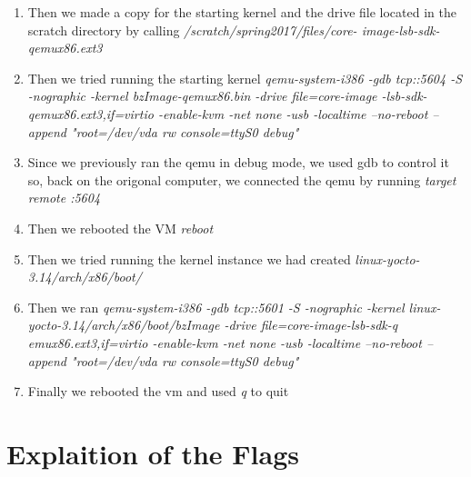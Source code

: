 \begin{enumerate}
    \item Then we made a copy for the starting kernel and the drive file located in the scratch directory by calling \textit{/scratch/spring2017/files/core-    image-lsb-sdk-qemux86.ext3}
    \item Then we tried running the starting kernel \textit{qemu-system-i386 -gdb tcp::5604 -S -nographic -kernel bzImage-qemux86.bin -drive file=core-image    -lsb-sdk-qemux86.ext3,if=virtio -enable-kvm -net none -usb -localtime --no-reboot --append "root=/dev/vda rw console=ttyS0 debug"}
    \item Since we previously ran the qemu in debug mode, we used gdb to control it so, back on the origonal computer, we connected the qemu by running \textit{target remote :5604}
    \item Then we rebooted the VM \textit{reboot}
    \item Then we tried running the kernel instance we had created \textit{linux-yocto-3.14/arch/x86/boot/}
    \item Then we ran \textit{qemu-system-i386 -gdb tcp::5601 -S -nographic -kernel linux-yocto-3.14/arch/x86/boot/bzImage  -drive file=core-image-lsb-sdk-q    emux86.ext3,if=virtio -enable-kvm -net none -usb -localtime --no-reboot --append "root=/dev/vda rw console=ttyS0 debug"}
    \item Finally we rebooted the vm and used \textit{q} to quit
\end{enumerate}

\section{Explaition of the Flags}



